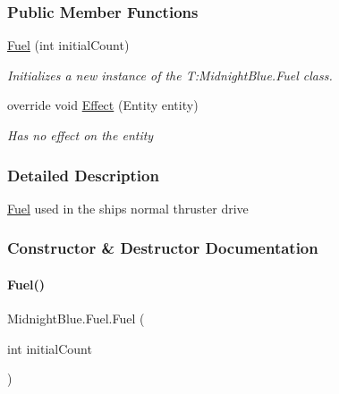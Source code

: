 \subsubsection*{Public Member Functions}
\begin{DoxyCompactItemize}
\item 
\hyperlink{class_midnight_blue_1_1_fuel_a44747305c7b7d4572d23fd764e568fc1}{Fuel} (int initial\+Count)
\begin{DoxyCompactList}\small\item\em Initializes a new instance of the T\+:\+Midnight\+Blue.\+Fuel class. \end{DoxyCompactList}\item 
override void \hyperlink{class_midnight_blue_1_1_fuel_a9ab52c79211ec8cdcc9389f772615ac0}{Effect} (Entity entity)
\begin{DoxyCompactList}\small\item\em Has no effect on the entity \end{DoxyCompactList}\end{DoxyCompactItemize}


\subsubsection{Detailed Description}
\hyperlink{class_midnight_blue_1_1_fuel}{Fuel} used in the ships normal thruster drive 



\subsubsection{Constructor \& Destructor Documentation}
\hypertarget{class_midnight_blue_1_1_fuel_a44747305c7b7d4572d23fd764e568fc1}{}\label{class_midnight_blue_1_1_fuel_a44747305c7b7d4572d23fd764e568fc1} 
\paragraph{\texorpdfstring{Fuel()}{Fuel()}}
{\footnotesize\ttfamily Midnight\+Blue.\+Fuel.\+Fuel (\begin{DoxyParamCaption}\item[{int}]{initial\+Count }\end{DoxyParamCaption})\hspace{0.3cm}{\ttfamily [inline]}}



